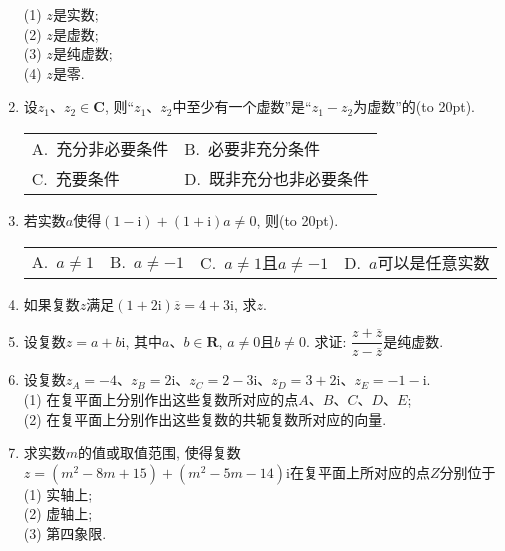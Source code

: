 \documentclass[10pt,a4paper]{article}
\newcommand{\bracket}[1]{(\hbox to #1pt{})}
\newcommand{\twoch}[4]{\par\begin{tabular}{p{.46\textwidth}p{.46\textwidth}}
A.~#1& B.~#2\\
C.~#3& D.~#4
\end{tabular}}
\newcommand{\fourch}[4]{\par\begin{tabular}{p{.23\textwidth}p{.23\textwidth}p{.23\textwidth}p{.23\textwidth}}
A.~#1 &B.~#2& C.~#3& D.~#4
\end{tabular}}
\begin{document}
\begin{enumerate}[1.]
(1) $z$是实数;\\
(2) $z$是虚数;\\
(3) $z$是纯虚数;\\
(4) $z$是零.
\item 设$z_1$、$z_2\in \mathbf{C}$, 则``$z_1$、$z_2$中至少有一个虚数''是``$z_1-z_2$为虚数''的\bracket{20}.
\twoch{充分非必要条件}{必要非充分条件}{充要条件}{既非充分也非必要条件}
\item 若实数$a$使得$(1-\mathrm{i})+(1+\mathrm{i})a\ne 0$, 则\bracket{20}.
\fourch{$a\ne 1$}{$a\ne -1$}{$a\ne 1$且$a\ne -1$}{$a$可以是任意实数}
\item 如果复数$z$满足$(1+2\mathrm{i})\overline z=4+3\mathrm{i}$, 求$z$.
\item 设复数$z=a+b\mathrm{i}$, 其中$a$、$b\in \mathbf{R}$, $a\ne 0$且$b\ne 0$. 求证: $\dfrac{z+\overline z}{z-\overline z}$是纯虚数.
\item 设复数$z_A=-4$、$z_B=2\mathrm{i}$、$z_C=2-3\mathrm{i}$、$z_D=3+2\mathrm{i}$、$z_E=-1-\mathrm{i}$.\\
(1) 在复平面上分别作出这些复数所对应的点$A$、$B$、$C$、$D$、$E$;\\
(2) 在复平面上分别作出这些复数的共轭复数所对应的向量.
\item 求实数$m$的值或取值范围, 使得复数$z=(m^2-8m+15)+(m^2-5m-14)\mathrm{i}$在复平面上所对应的点$Z$分别位于\\
(1) 实轴上;\\
(2) 虚轴上;\\
(3) 第四象限.


\iffalse














\end{enumerate}
\end{document}
